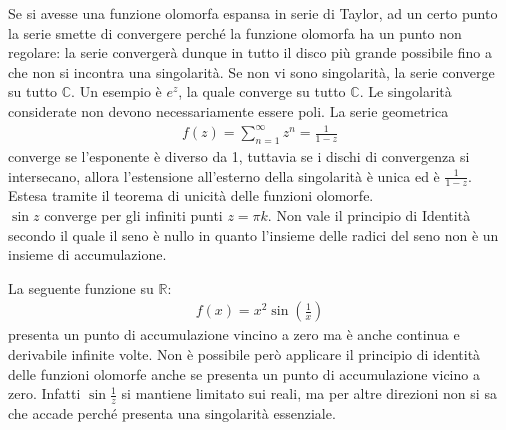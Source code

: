 \documentclass[a4paper, oneside]{article}
\begin{document}
\begin{corollary}
    Se si avesse una funzione olomorfa espansa in serie di Taylor, 
    ad un certo punto la serie smette di convergere perché la funzione olomorfa 
    ha un punto non regolare: la serie convergerà dunque in tutto il disco più grande 
    possibile fino a che non si incontra una singolarità. Se non vi sono singolarità, 
    la serie converge su tutto $\mathbb{C}$. Un esempio è $e^{z}$, la quale 
    converge su tutto $\mathbb{C}$. Le singolarità considerate non devono necessariamente essere poli.
    La serie geometrica
    \begin{gather*}
        f(z)  = \sum_{n = 1}^{\infty } z^{n}  = \frac{1}{1 - z}
    \end{gather*}
    converge se l'esponente è diverso da 1, tuttavia se i dischi di convergenza si intersecano,
    allora l'estensione all'esterno della singolarità è unica ed è $\frac{1}{1 - z}$.
    Estesa tramite il teorema di unicità delle funzioni olomorfe. \\
    $\sin z$ converge per gli infiniti punti $z = \pi k$. Non vale il principio di 
    Identità secondo il quale il seno è nullo in quanto l'insieme delle radici del seno non 
    è un insieme di accumulazione.
\end{corollary}
\begin{example}
    La seguente funzione su $\mathbb{R}$:
    \begin{gather*}
        f(x) = x^{2}\sin\left(\frac{1}{x}\right)
    \end{gather*}
    presenta un punto di accumulazione vincino a zero ma è anche continua 
    e derivabile infinite volte. Non è possibile però applicare il principio di identità delle
    funzioni olomorfe anche se presenta un punto di accumulazione vicino a zero. Infatti 
    $\sin\frac{1}{z}$ si mantiene limitato sui reali, ma per altre direzioni non si sa che 
    accade perché presenta una singolarità essenziale.
\end{example}
\end{document}
